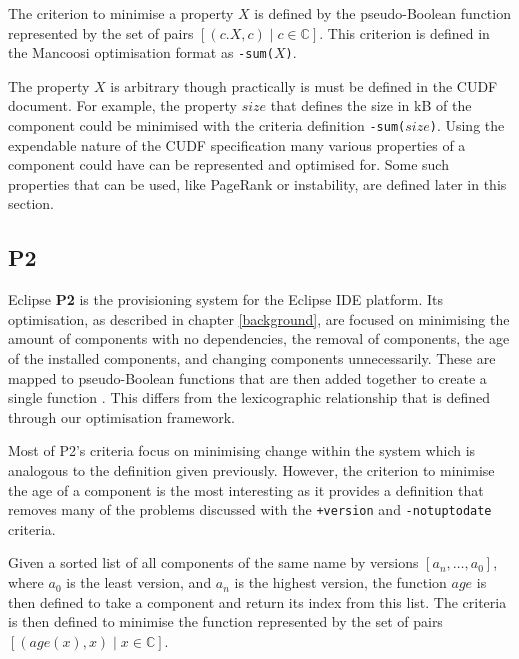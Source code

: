 \begin{defs}
The criterion to minimise a property $X$ is defined by the pseudo-Boolean function 
represented by the set of pairs $[(c.X, c) \mid c \in \mathbb{C}]$.
This criterion is defined in the Mancoosi optimisation format as \verb+-sum(+$X$\verb+)+.
\end{defs}

The property $X$ is arbitrary though practically is must be defined in the CUDF document.
For example, the property $size$ that defines the size in kB of the component could be minimised with the criteria definition \verb+-sum(+$size$\verb+)+.
Using the expendable nature of the CUDF specification many various properties of a component could have can be represented and optimised for.
Some such properties that can be used, like PageRank or instability, are defined later in this section.

\subsection{P2}
Eclipse \textbf{P2} \cite{le_berre_dependency_2009,leBerre2010} is the provisioning system for the Eclipse IDE platform.
Its optimisation, as described in chapter \ref{background}, are focused on minimising the amount of components with no dependencies, the removal of components,
the age of the installed components, and changing components unnecessarily.
These are mapped to pseudo-Boolean functions that are then added together to create a single function \citep{leBerre2010}.
This differs from the lexicographic relationship that is defined through our optimisation framework.

Most of P2's criteria focus on minimising change within the system which is analogous to the definition given previously.
However, the criterion to minimise the age of a component is the most interesting as it provides a definition that removes many of the problems
discussed with the  \verb!+version! and \verb+-notuptodate+ criteria.

\begin{defs}
Given a sorted list of all components of the same name by versions $[a_n,\ldots,a_0]$, where $a_0$ is the least version, and $a_n$ is the highest version,
the function $age$ is then defined to take a component and return its index from this list.
The criteria is then defined to minimise the function represented by the set of pairs $[(age(x), x) \mid x \in \mathbb{C}]$.
\end{defs}

